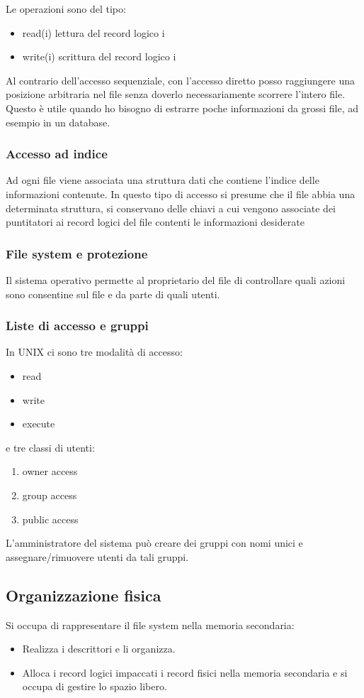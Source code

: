\documentclass
[10pt,        %
 a4paper,     %
 onecolumn,   %
 fleqn,       %
 oneside,     %
 notitlepage, %
]{article}    %
\begin{document}
Le operazioni sono del tipo: 
\begin{itemize}
    \item read(i) lettura del record logico i
    \item write(i) scrittura del record logico i
\end{itemize}
Al contrario dell'accesso sequenziale, con l'accesso diretto posso raggiungere una posizione arbitraria nel file senza doverlo necessariamente scorrere l'intero file. Questo è utile quando ho bisogno di estrarre poche informazioni da grossi file, ad esempio in un database.

\subsubsection{Accesso ad indice}
Ad ogni file viene associata una struttura dati che contiene l'indice delle informazioni contenute. In questo tipo di accesso si presume che il file abbia una determinata struttura, si conservano delle chiavi a cui vengono associate dei puntitatori ai record logici del file contenti le informazioni desiderate

\subsubsection{File system e protezione}
Il sistema operativo permette al proprietario del file di controllare quali azioni sono consentine sul file e da parte di quali utenti.

\subsubsection{Liste di accesso e gruppi}
In UNIX ci sono tre modalità di accesso: 
\begin{itemize}
    \item read
    \item write
    \item execute
\end{itemize}
e tre classi di utenti:
\begin{enumerate}
    \item owner access
    \item group access
    \item public access
\end{enumerate}
L'amministratore del sistema può creare dei gruppi con nomi unici e assegnare/rimuovere utenti da tali gruppi. 

\subsection{Organizzazione fisica}
Si occupa di rappresentare il file system nella memoria secondaria:
\begin{itemize}
    \item Realizza i descrittori e li organizza.
    \item Alloca i record logici impaccati i record fisici nella memoria secondaria e si occupa di gestire lo spazio libero.
\end{itemize}
\end{document}
